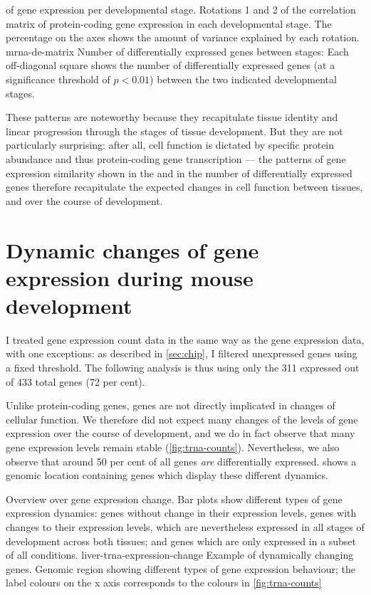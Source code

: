     {\pca of \mrna gene expression per developmental stage.}
    {Rotations \num{1} and \num{2} of the correlation matrix of
    protein-coding gene expression in each developmental stage. The percentage
    on the axes shows the amount of variance explained by each rotation.}
    {mrna-de-matrix}
    {Number of differentially expressed \mrna genes between stages:}
    {Each off-diagonal square shows the number of differentially
    expressed genes (at a significance threshold of \(p<0.01\)) between
    the two indicated developmental stages.}

These patterns are noteworthy because they recapitulate tissue identity and
linear progression through the stages of tissue development. But they are not
particularly surprising: after all, cell function is dictated by specific
protein abundance and thus protein-coding gene transcription --- the patterns of
gene expression similarity shown in the \pca and in the number of differentially
expressed genes therefore recapitulate the expected changes in cell function
between tissues, and over the course of development.

\section{Dynamic changes of  gene expression during mouse
development}

I treated \trna gene expression count data in the same way as the \mrna gene
expression data, with one exceptions: as described in \cref{sec:chip}, I
filtered unexpressed \trna genes using a fixed threshold. The following analysis
is thus using only the \num{311} expressed out of \num{433} total genes
(\num{72} per cent).

Unlike protein-coding genes, \trna genes are not directly implicated in changes
of cellular function. We therefore did not expect many changes of the levels of
\trna gene expression over the course of development, and we do in fact observe
that many \trna gene expression levels remain stable (\cref{fig:trna-counts}).
Nevertheless, we also observe that around \num{50} per cent of all \trna genes
\emph{are} differentially expressed. 
shows a genomic location containing \trna genes which display these different
dynamics.

    {Overview over \trna gene expression change.}
    {Bar plots show different types of \trna gene expression dynamics: \trna
    genes without change in their expression levels, \trna genes with changes to
    their expression levels, which are nevertheless expressed in all stages of
    development across both tissues; and \trna genes which are only expressed in
    a subset of all conditions.}
    {liver-trna-expression-change}
    {Example of dynamically changing \trna genes.}
    {Genomic region showing different types of \trna gene expression behaviour;
    the label colours on the x axis corresponds to the colours in
    \cref{fig:trna-counts}}

